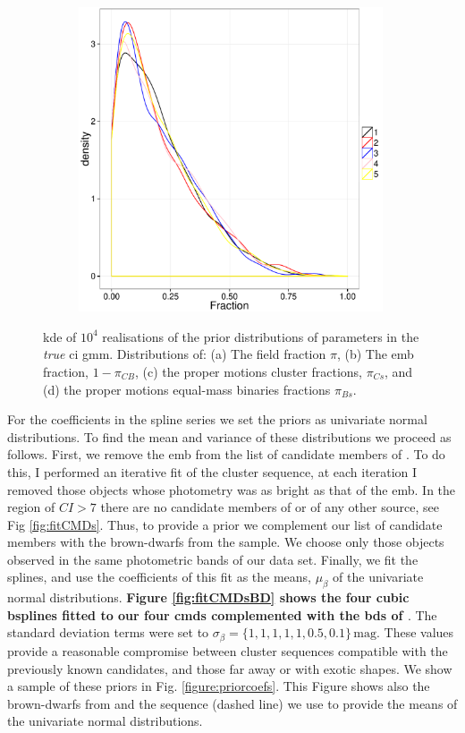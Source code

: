 \begin{figure}[ht!]
\begin{subfigure}[t]{0.48\textwidth}
        \caption{}
    \end{subfigure}
     \begin{subfigure}[t]{0.48\textwidth}
      \includegraphics[page=4,height=9cm,width=\textwidth]{background/Figures/Priors_Color.pdf}
        \caption{}
    \end{subfigure}
\caption{\gls{kde} of $10^4$ realisations of the prior distributions of parameters in the \emph{true} \gls{ci} \gls{gmm}. Distributions of: (a) The field fraction $\pi$, (b) The \gls{emb} fraction, $1-\pi_{CB}$, (c) the proper motions cluster fractions, $\pi_{Cs}$, and (d) the proper motions equal-mass binaries fractions $\pi_{Bs}$.}
\label{fig:priors_colour}
\end{figure}

For the coefficients in the spline series we set the priors as univariate normal distributions. To find the mean and variance of these distributions we proceed as follows. First, we remove the \gls{emb} from the list of candidate members of \citet{Bouy2015}. To do this, I performed an iterative fit of the cluster sequence, at each iteration I removed those objects whose photometry was  as bright as that of the \gls{emb}. In the region of $CI > 7$ there are no candidate members of \citet{Bouy2015} or of any other source, see Fig \ref{fig:fitCMDs}. Thus, to provide a prior we complement our list of candidate members with the brown-dwarfs from the \citet{Faherty2012} sample. We choose only those objects observed in the same photometric bands of our data set. Finally, we fit the splines, and use the coefficients of this fit as the means, $\mu_{\beta}$ of the univariate normal distributions. \textbf{Figure \ref{fig:fitCMDsBD} shows the four cubic \glspl{bspline} fitted to our four \glspl{cmd} complemented with the \glspl{bd} of \citet{Faherty2012}}. The standard deviation terms were set to $\sigma_{\beta}=\{1,1,1,1,1,0.5,0.1\}\,\mathrm{mag}$. These values provide a reasonable compromise between cluster sequences compatible with the previously known candidates, and those far away or with exotic shapes. We show a sample of these priors in Fig. \ref{figure:priorcoefs}. This Figure shows also the brown-dwarfs from \citet{Faherty2012} and the sequence (dashed line) we use to provide the means of the univariate normal distributions.

